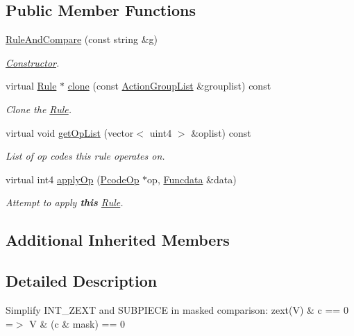 \subsection*{Public Member Functions}
\begin{DoxyCompactItemize}
\item 
\mbox{\hyperlink{class_rule_and_compare_a9bd30b1bc948eef91c027250f0bf21d5}{Rule\+And\+Compare}} (const string \&g)
\begin{DoxyCompactList}\small\item\em \mbox{\hyperlink{class_constructor}{Constructor}}. \end{DoxyCompactList}\item 
virtual \mbox{\hyperlink{class_rule}{Rule}} $\ast$ \mbox{\hyperlink{class_rule_and_compare_a9ae35d0a775af1e5d057c0d6cf1d4860}{clone}} (const \mbox{\hyperlink{class_action_group_list}{Action\+Group\+List}} \&grouplist) const
\begin{DoxyCompactList}\small\item\em Clone the \mbox{\hyperlink{class_rule}{Rule}}. \end{DoxyCompactList}\item 
virtual void \mbox{\hyperlink{class_rule_and_compare_abe15ea639507c25e7ff33823f986e971}{get\+Op\+List}} (vector$<$ uint4 $>$ \&oplist) const
\begin{DoxyCompactList}\small\item\em List of op codes this rule operates on. \end{DoxyCompactList}\item 
virtual int4 \mbox{\hyperlink{class_rule_and_compare_a5bbd46f5a5c6969289ce7084c3bac4f7}{apply\+Op}} (\mbox{\hyperlink{class_pcode_op}{Pcode\+Op}} $\ast$op, \mbox{\hyperlink{class_funcdata}{Funcdata}} \&data)
\begin{DoxyCompactList}\small\item\em Attempt to apply {\bfseries{this}} \mbox{\hyperlink{class_rule}{Rule}}. \end{DoxyCompactList}\end{DoxyCompactItemize}
\subsection*{Additional Inherited Members}


\subsection{Detailed Description}
Simplify I\+N\+T\+\_\+\+Z\+E\+XT and S\+U\+B\+P\+I\+E\+CE in masked comparison\+: {\ttfamily zext(\+V) \& c == 0 =$>$ V \& (c \& mask) == 0} 

